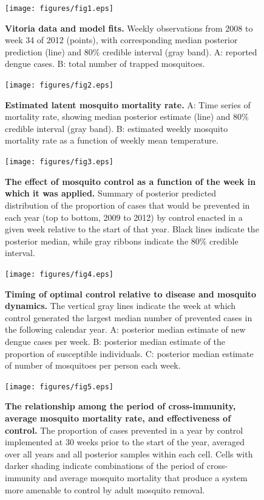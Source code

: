 \documentclass[10pt,letterpaper]{article}
\begin{document}
\begin{figure}[!h]
\texttt{[image: figures/fig1.eps]}
\caption{{\bf Vitoria data and model fits.}
Weekly observations from 2008 to week 34 of 2012 (points), with corresponding median posterior prediction (line) and 80\% credible interval (gray band). A: reported dengue cases. B: total number of trapped mosquitoes.
}
\label{timeseries}
\end{figure}

\begin{figure}[!h]
\texttt{[image: figures/fig2.eps]}
\caption{{\bf Estimated latent mosquito mortality rate.}
A: Time series of mortality rate, showing median posterior estimate (line) and 80\% credible interval (gray band). B: estimated weekly mosquito mortality rate as a function of weekly mean temperature.
}
\label{mortality}
\end{figure}

\begin{figure}[!h]
\texttt{[image: figures/fig3.eps]}
\caption{{\bf The effect of mosquito control as a function of the week in which it was applied.}
Summary of posterior predicted distribution of the proportion of cases that would be prevented in each year (top to bottom, 2009 to 2012) by control enacted in a given week relative to the start of that year. Black lines indicate the posterior median, while gray ribbons indicate the $80\%$ credible interval.
}
\label{control}
\end{figure}

\begin{figure}[!h]
\texttt{[image: figures/fig4.eps]}
\caption{{\bf Timing of optimal control relative to disease and mosquito dynamics.}
The vertical gray lines indicate the week at which control generated the largest median number of prevented cases in the following calendar year. A: posterior median estimate of new dengue cases per week. B: posterior median estimate of the proportion of susceptible individuals. C: posterior median estimate of number of mosquitoes per person each week.
}
\label{timing}
\end{figure}

\begin{figure}[!h]
\texttt{[image: figures/fig5.eps]}
\caption{{\bf The relationship among the period of cross-immunity, average mosquito mortality rate, and effectiveness of control.}
The proportion of cases prevented in a year by control implemented at 30 weeks prior to the start of the year, averaged over all years and all posterior samples within each cell. Cells with darker shading indicate combinations of the period of cross-immunity and average mosquito mortality that produce a system more amenable to control by adult mosquito removal.
}
\label{immunity}
\end{figure}
\end{document}
